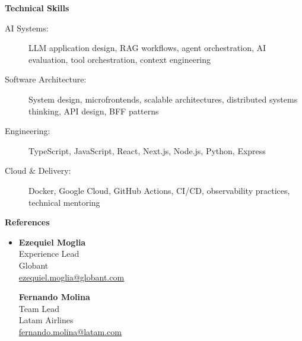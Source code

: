\documentclass[letterpaper,11pt]{article}
\newcommand{\resheading}[1]{{\large \colorbox{mygrey}{\begin{minipage}{\textwidth}{\textbf{#1 \vphantom{p\^{E}}}}\end{minipage}}}}
\begin{document}
    \resheading{Technical Skills}
        \begin{description}
            \item[AI Systems:] { \footnotesize LLM application design, RAG workflows, agent orchestration, AI evaluation, tool orchestration, context engineering}
            \item[Software Architecture:] { \footnotesize System design, microfrontends, scalable architectures, distributed systems thinking, API design, BFF patterns}
            \item[Engineering:] { \footnotesize TypeScript, JavaScript, React, Next.js, Node.js, Python, Express}
            \item[Cloud \& Delivery:] { \footnotesize Docker, Google Cloud, GitHub Actions, CI/CD, observability practices, technical mentoring}
        \end{description} %
    \resheading{References}
        \begin{itemize}
            \item[]
                \begin{minipage}[t]{0.45\textwidth}
                    \textbf{Ezequiel Moglia}\\
                    Experience Lead\\
                    Globant\\
                    \href{mailto:ezequiel.moglia@globant.com}{ezequiel.moglia@globant.com}
                \end{minipage}
                \hfill
                \begin{minipage}[t]{0.45\textwidth}
                    \textbf{Fernando Molina}\\
                    Team Lead\\
                    Latam Airlines\\
                    \href{mailto:fernando.molina@latam.com}{fernando.molina@latam.com}
                \end{minipage}
        \end{itemize}

    
\end{document}
